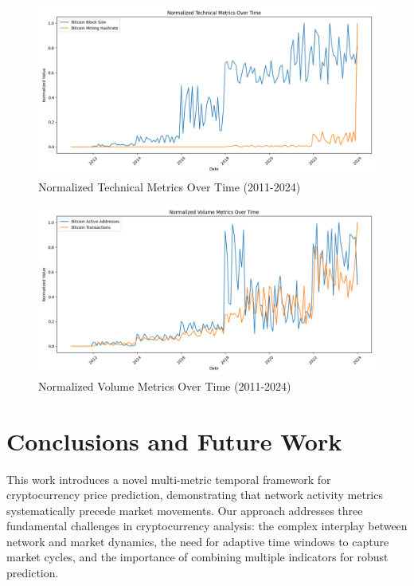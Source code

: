 \documentclass{article} %
\begin{document}
\begin{figure}[h]
    \centering
    \includegraphics[width=\textwidth]{technical_metrics.png}
    \caption{Normalized Technical Metrics Over Time (2011-2024)}
    \label{fig:technical_metrics}
\end{figure}

\begin{figure}[h]
    \centering
    \includegraphics[width=\textwidth]{volume_metrics.png}
    \caption{Normalized Volume Metrics Over Time (2011-2024)}
    \label{fig:volume_metrics}
\end{figure}

\section{Conclusions and Future Work}
\label{sec:conclusion}

This work introduces a novel multi-metric temporal framework for cryptocurrency price prediction, demonstrating that network activity metrics systematically precede market movements. Our approach addresses three fundamental challenges in cryptocurrency analysis: the complex interplay between network and market dynamics, the need for adaptive time windows to capture market cycles, and the importance of combining multiple indicators for robust prediction.
\end{document}
